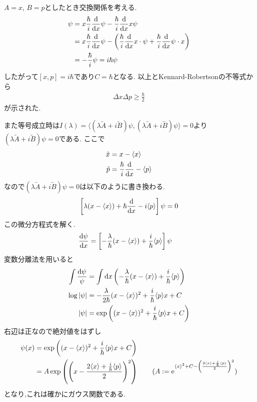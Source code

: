 \documentclass[uplatex,a4j,11pt]{jsarticle}
\def\product<#1>{\langle #1 \rangle}
\begin{document}
\subsubsection{}
$A=x$, $B=p$としたとき交換関係を考える.
\begin{align*}
  [x,p]\psi&=x\frac{\hbar}{i}\frac{\rm d}{{\rm d}x}\psi-\frac{\hbar}{i}\frac{\rm d}{{\rm d}x}x\psi\\
  &=x\frac{\hbar}{i}\frac{\rm d}{{\rm d}x}\psi-\left(\frac{\hbar}{i}\frac{\rm d}{{\rm d}x}x\cdot\psi+\frac{\hbar}{i}\frac{\rm d}{{\rm d}x}\psi\cdot x\right)\\
  &=-\frac{\hbar}{i}\psi=i\hbar\psi
\end{align*}
したがって$[x,p]=i\hbar$であり$C=\hbar$となる.
以上とKennard-Robertsonの不等式から
\begin{align*}
  \Delta x\Delta p\geq\frac{\hbar}{2}
\end{align*}
が示された.

また等号成立時は$I(\lambda)=\product<(\lambda\tilde{A}+i\tilde{B})\psi,(\lambda\tilde{A}+i\tilde{B})\psi>=0$より$(\lambda\tilde{A}+i\tilde{B})\psi=0$である.
ここで
\begin{align*}
  \tilde{x}&=x-\product<x>\\
  \tilde{p}&=\frac{\hbar}{i}\frac{\rm d}{{\rm d}x}-\product<p>\\
\end{align*}
なので$(\lambda\tilde{A}+i\tilde{B})\psi=0$は以下のように書き換わる.
\begin{align*}
  \left[\lambda(x-\product<x>)+\hbar\frac{\rm d}{{\rm d}x}-i\product<p>\right]\psi=0
\end{align*}
この微分方程式を解く.
\begin{align*}
  \frac{{\rm d}\psi}{{\rm d}x}&=\left[-\frac{\lambda}{\hbar}(x-\product<x>)+\frac{i}{\hbar}\product<p>\right]\psi
\end{align*}
変数分離法を用いると
\begin{align*}
  \int\frac{{\rm d}\psi}{\psi}&=\int{\rm d}x\left(-\frac{\lambda}{\hbar}(x-\product<x>)+\frac{i}{\hbar}\product<p>\right)\\
  \log|\psi|&=-\frac{\lambda}{2\hbar}(x-\product<x>)^2+\frac{i}{\hbar}\product<p>x+C\\
  |\psi|&=\exp\left((x-\product<x>)^2+\frac{i}{\hbar}\product<p>x+C\right)
\end{align*}
右辺は正なので絶対値をはずし
\begin{align*}
  \psi(x)&=\exp\left((x-\product<x>)^2+\frac{i}{\hbar}\product<p>x+C\right)\\
  &=A\exp\left(\left(x-\frac{2\product<x>+\frac{i}{\hbar}\product<p>}{2}\right)^2\right)\qquad(A:={\rm e}^{\product<x>^2+C-\left(\frac{2\product<x>+\frac{i}{\hbar}\product<p>}{2}\right)^2})
\end{align*}
となり,これは確かにガウス関数である.
\end{document}
